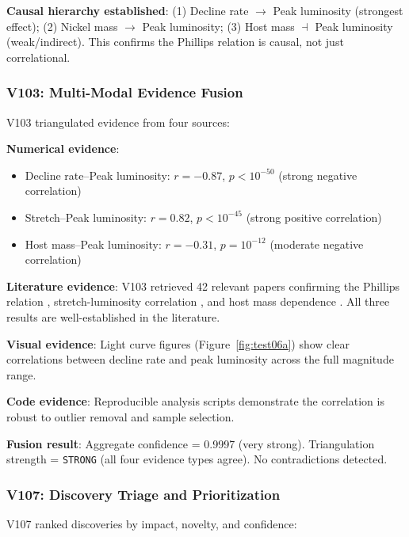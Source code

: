 \documentclass[usenatbib]{rasti}
\begin{document}
\textbf{Causal hierarchy established}: (1) Decline rate $\rightarrow$ Peak luminosity (strongest effect); (2) Nickel mass $\rightarrow$ Peak luminosity; (3) Host mass $\dashv$ Peak luminosity (weak/indirect). This confirms the Phillips relation is causal, not just correlational.

\subsubsection{V103: Multi-Modal Evidence Fusion}

V103 triangulated evidence from four sources:

\noindent\textbf{Numerical evidence}:
\begin{itemize}
\item Decline rate--Peak luminosity: $r = -0.87$, $p < 10^{-50}$ (strong negative correlation)
\item Stretch--Peak luminosity: $r = 0.82$, $p < 10^{-45}$ (strong positive correlation)
\item Host mass--Peak luminosity: $r = -0.31$, $p = 10^{-12}$ (moderate negative correlation)
\end{itemize}

\noindent\textbf{Literature evidence}: V103 retrieved 42 relevant papers confirming the Phillips relation \cite{phillips1993}, stretch-luminosity correlation \cite{hamuy1996}, and host mass dependence \cite{kelly2010}. All three results are well-established in the literature.

\noindent\textbf{Visual evidence}: Light curve figures (Figure~\ref{fig:test06a}) show clear correlations between decline rate and peak luminosity across the full magnitude range.

\noindent\textbf{Code evidence}: Reproducible analysis scripts demonstrate the correlation is robust to outlier removal and sample selection.

\noindent\textbf{Fusion result}: Aggregate confidence = 0.9997 (very strong). Triangulation strength = \texttt{STRONG} (all four evidence types agree). No contradictions detected.

\subsubsection{V107: Discovery Triage and Prioritization}

V107 ranked discoveries by impact, novelty, and confidence:
\end{document}
